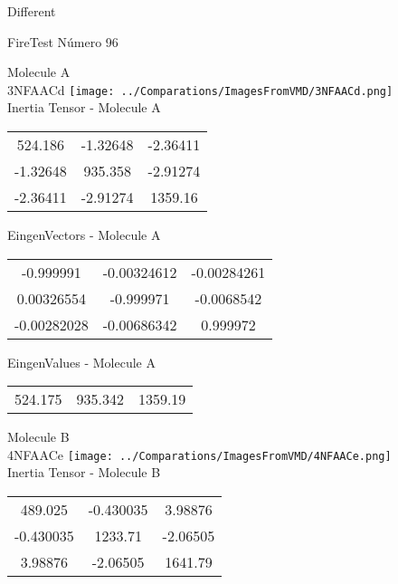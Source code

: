 \begin{center}
\vtab
\vtab
\textcolor{NavyBlue}{\Large Different}
\end{center}

 \newpage

\vtab[-2cm]
\begin{center}
{\large FireTest \tab Número 96}
\end{center}
\begin{multicols}{2}
\begin{center}

Molecule A \\ 
3NFAACd
\texttt{[image: ../Comparations/ImagesFromVMD/3NFAACd.png]}
\\
Inertia Tensor - Molecule A \\
\vtab

\begin{tabular}{|c c c|}
524.186	 & 	-1.32648	 & 	-2.36411	 \\
-1.32648	 & 	935.358	 & 	-2.91274	 \\
-2.36411	 & 	-2.91274	 & 	1359.16
\end{tabular}

\vtab
 EingenVectors - Molecule A     \\
\vtab
\begin{tabular}{|c c c|}
-0.999991	 & 	-0.00324612	 & 	-0.00284261	 \\
0.00326554	 & 	-0.999971	 & 	-0.0068542	 \\
-0.00282028	 & 	-0.00686342	 & 	0.999972
\end{tabular}

\vtab
 EingenValues - Molecule A     \\
\vtab
\begin{tabular}{|c c c|}
524.175	 & 	935.342	 & 	1359.19	 \\
\end{tabular}
\columnbreak

Molecule B \\ 
4NFAACe
\texttt{[image: ../Comparations/ImagesFromVMD/4NFAACe.png]}
\\
Inertia Tensor - Molecule B \\
\vtab

\begin{tabular}{|c c c|}
489.025	 & 	-0.430035	 & 	3.98876	 \\
-0.430035	 & 	1233.71	 & 	-2.06505	 \\
3.98876	 & 	-2.06505	 & 	1641.79
\end{tabular}


\end{center}
\end{multicols}

